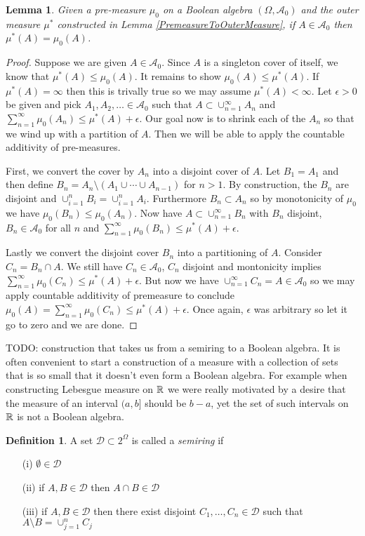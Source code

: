 \documentclass{amsart}
\newtheorem{lem}[thm]{Lemma}
\theoremstyle{remark}
\theoremstyle{definition}
\newtheorem{defn}[thm]{Definition}
\begin{document}
\begin{lem}\label{PremeasureOuterMeasureEqual}Given a pre-measure $\mu_0$ on a Boolean algebra $(\Omega,
  \mathcal{A}_0)$ and the outer measure $\mu^*$ constructed in Lemma
  \ref{PremeasureToOuterMeasure}, if $A \in \mathcal{A}_0$ then $\mu^*(A)=\mu_0(A)$.
\end{lem}
\begin{proof}
Suppose we are given $A \in \mathcal{A}_0$.  Since $A$ is a singleton
cover of itself, we know that $\mu^*(A) \leq \mu_0(A)$.  It remains to
show $\mu_0(A) \leq \mu^*(A)$.  If $\mu^*(A) =\infty$ then this is
trivally true so we may assume $\mu^*(A) < \infty$.  Let $\epsilon
>0$ be given and pick $A_1, A_2, \dotsc \in \mathcal{A}_0$ such that
$A \subset \cup_{n=1}^\infty A_n$ and 
$\sum_{n=1}^\infty \mu_0(A_n) \leq \mu^*(A) + \epsilon$.  Our goal now
is to shrink each of the $A_n$ so that we wind up with a partition of
$A$.  Then we will be able to apply the countable additivity of pre-measures.

First, we convert the cover by $A_n$ into a disjoint cover of $A$.  Let
$B_1 = A_1$ and then define $B_n = A_n \setminus (A_1 \cup \cdots \cup
A_{n-1})$ for $n>1$.
By construction, the $B_n$ are disjoint and $\cup_{i=1}^n B_i =
\cup_{i=1}^n A_i$.  Furthermore $B_n \subset A_n$ so by monotonicity
of $\mu_0$ we have $\mu_0(B_n) \leq \mu_0(A_n)$.  Now have $A \subset
\cup_{n=1}^\infty B_n$ with $B_n$ disjoint, $B_n \in \mathcal{A}_0$
for all $n$  and $\sum_{n=1}^\infty
\mu_0(B_n) \leq \mu^*(A) + \epsilon$.  

Lastly we convert the disjoint cover $B_n$ into a partitioning of $A$.  
Consider $C_n = B_n \cap A$.  We still have $C_n \in
\mathcal{A}_0$, $C_n$ disjoint and montonicity implies $\sum_{n=1}^\infty
\mu_0(C_n) \leq \mu^*(A) + \epsilon$.  But now we have
$\cup_{n=1}^\infty C_n = A \in \mathcal{A}_0$ so we may apply
countable additivity of premeasure to conclude $\mu_0(A) = \sum_{n=1}^\infty
\mu_0(C_n) \leq \mu^*(A) + \epsilon$.  Once again, $\epsilon$ was
arbitrary so let it go to zero and we are done.
\end{proof}


TODO: construction that takes us from a semiring to a Boolean algebra.
It is often convenient to start a construction of a measure with a
collection of sets that is so small that it doesn't even form a
Boolean algebra.  For example when constructing Lebesgue measure on
$\mathbb{R}$ we were really motivated by a desire that the measure of an
interval $(a,b]$ should be $b-a$, yet the set of such intervals on
$\mathbb{R}$ is not a Boolean algebra.
\begin{defn}A set $\mathcal{D} \subset 2^\Omega$ is called a
  \emph{semiring} if 
\begin{itemize}
\item[(i)]$\emptyset \in \mathcal{D}$
\item[(ii)]if $A, B \in \mathcal{D}$ then $A \cap B \in \mathcal{D}$
\item[(iii)]if $A, B \in \mathcal{D}$ then there exist disjoint $C_1,
  \dotsc, C_n \in \mathcal{D}$ such that $A \setminus B = \cup_{j=1}^n
  C_j$
\end{itemize}
\end{defn}
\end{document}
